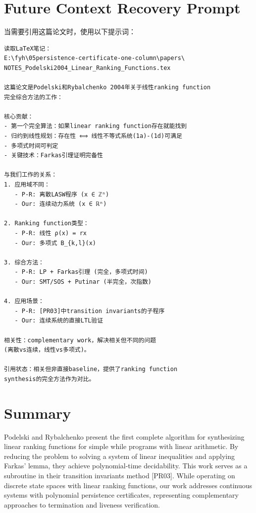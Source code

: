 \documentclass{article}
\begin{document}
\section{Future Context Recovery Prompt}

当需要引用这篇论文时，使用以下提示词：

\begin{verbatim}
读取LaTeX笔记：
E:\fyh\05persistence-certificate-one-column\papers\
NOTES_Podelski2004_Linear_Ranking_Functions.tex

这篇论文是Podelski和Rybalchenko 2004年关于线性ranking function
完全综合方法的工作：

核心贡献：
- 第一个完全算法：如果linear ranking function存在就能找到
- 归约到线性规划：存在性 ⟺ 线性不等式系统(1a)-(1d)可满足
- 多项式时间可判定
- 关键技术：Farkas引理证明完备性

与我们工作的关系：
1. 应用域不同：
   - P-R: 离散LASW程序 (x ∈ ℤⁿ)
   - Our: 连续动力系统 (x ∈ ℝⁿ)

2. Ranking function类型：
   - P-R: 线性 ρ(x) = rx
   - Our: 多项式 B_{k,l}(x)

3. 综合方法：
   - P-R: LP + Farkas引理 (完全，多项式时间)
   - Our: SMT/SOS + Putinar (半完全，次指数)

4. 应用场景：
   - P-R: [PR03]中transition invariants的子程序
   - Our: 连续系统的直接LTL验证

相关性：complementary work，解决相关但不同的问题
(离散vs连续，线性vs多项式)。

引用状态：相关但非直接baseline，提供了ranking function
synthesis的完全方法作为对比。
\end{verbatim}

\section{Summary}

Podelski and Rybalchenko present the first complete algorithm for synthesizing linear ranking functions for simple while programs with linear arithmetic. By reducing the problem to solving a system of linear inequalities and applying Farkas' lemma, they achieve polynomial-time decidability. This work serves as a subroutine in their transition invariants method [PR03]. While operating on discrete state spaces with linear ranking functions, our work addresses continuous systems with polynomial persistence certificates, representing complementary approaches to termination and liveness verification.
\end{document}
